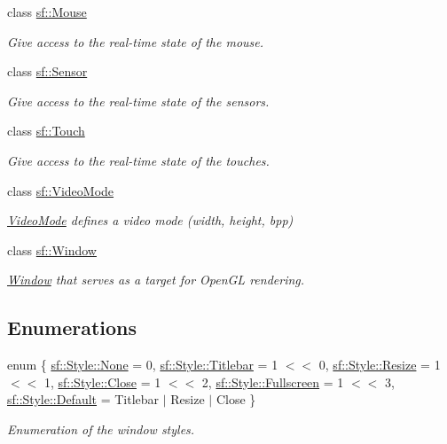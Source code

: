 \begin{DoxyCompactItemize}
class \hyperlink{classsf_1_1_mouse}{sf\+::\+Mouse}
\begin{DoxyCompactList}\small\item\em Give access to the real-\/time state of the mouse. \end{DoxyCompactList}\item 
class \hyperlink{classsf_1_1_sensor}{sf\+::\+Sensor}
\begin{DoxyCompactList}\small\item\em Give access to the real-\/time state of the sensors. \end{DoxyCompactList}\item 
class \hyperlink{classsf_1_1_touch}{sf\+::\+Touch}
\begin{DoxyCompactList}\small\item\em Give access to the real-\/time state of the touches. \end{DoxyCompactList}\item 
class \hyperlink{classsf_1_1_video_mode}{sf\+::\+Video\+Mode}
\begin{DoxyCompactList}\small\item\em \hyperlink{classsf_1_1_video_mode}{Video\+Mode} defines a video mode (width, height, bpp) \end{DoxyCompactList}\item 
class \hyperlink{classsf_1_1_window}{sf\+::\+Window}
\begin{DoxyCompactList}\small\item\em \hyperlink{classsf_1_1_window}{Window} that serves as a target for Open\+GL rendering. \end{DoxyCompactList}\end{DoxyCompactItemize}
\subsection*{Enumerations}
\begin{DoxyCompactItemize}
\item 
enum \{ \newline
\hyperlink{group__window_ggaf2f7d60d9ff2bee891b47d8528c1d1efa8c35a9c8507559e455387fc4a83ce422}{sf\+::\+Style\+::\+None} = 0, 
\hyperlink{group__window_ggaf2f7d60d9ff2bee891b47d8528c1d1efab4c8b32b05ed715928513787cb1e85b6}{sf\+::\+Style\+::\+Titlebar} = 1 $<$$<$ 0, 
\hyperlink{group__window_ggaf2f7d60d9ff2bee891b47d8528c1d1efaccff967648ebcd5db2007eff7352b50f}{sf\+::\+Style\+::\+Resize} = 1 $<$$<$ 1, 
\hyperlink{group__window_ggaf2f7d60d9ff2bee891b47d8528c1d1efae07a7d411d5acf28f4a9a4b76a3a9493}{sf\+::\+Style\+::\+Close} = 1 $<$$<$ 2, 
\newline
\hyperlink{group__window_ggaf2f7d60d9ff2bee891b47d8528c1d1efa6288ec86830245cf957e2d234f79f50d}{sf\+::\+Style\+::\+Fullscreen} = 1 $<$$<$ 3, 
\hyperlink{group__window_ggaf2f7d60d9ff2bee891b47d8528c1d1efa5597cd420fc461807e4a201c92adea37}{sf\+::\+Style\+::\+Default} = Titlebar $\vert$ Resize $\vert$ Close
 \}\begin{DoxyCompactList}\small\item\em Enumeration of the window styles. \end{DoxyCompactList}
\end{DoxyCompactItemize}


